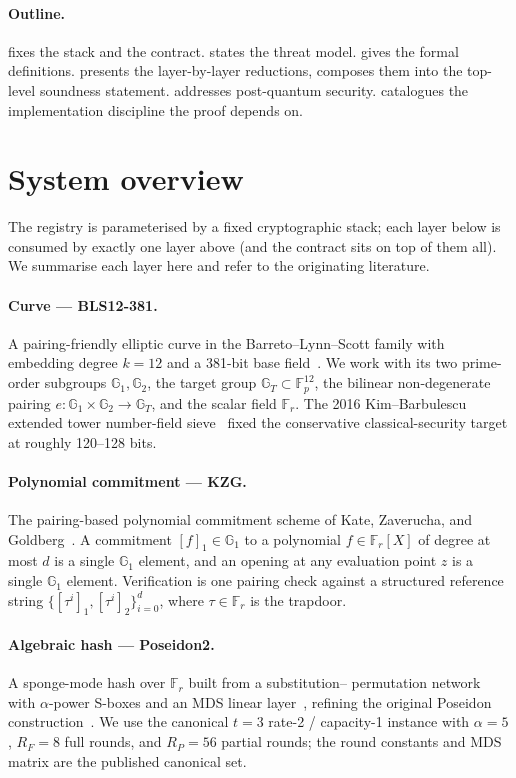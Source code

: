 \documentclass[11pt,a4paper]{article}
\theoremstyle{plain}
\theoremstyle{definition}
\newcommand{\Fr}{\mathbb{F}_r}
\newcommand{\Fp}{\mathbb{F}_p}
\newcommand{\GT}{\mathbb{G}_T}
\newcommand{\Gone}{\mathbb{G}_1}
\newcommand{\Gtwo}{\mathbb{G}_2}
\begin{document}
\paragraph{Outline.}  fixes the stack and the
contract.  states the threat model.
 gives the formal definitions. 
presents the layer-by-layer reductions,  composes
them into the top-level soundness statement. 
addresses post-quantum security.  catalogues the
implementation discipline the proof depends on.

\section{System overview}
\label{sec:system}

The registry is parameterised by a fixed cryptographic stack;
each layer below is consumed by exactly one layer above (and the
contract sits on top of them all). We summarise each layer here
and refer to the originating literature.

\paragraph{Curve --- BLS12-381.}
A pairing-friendly elliptic curve in the Barreto--Lynn--Scott
family with embedding degree $k=12$ and a 381-bit base
field~\cite{bowe-2017-bls12381}. We work with its two prime-order
subgroups $\Gone, \Gtwo$, the target group $\GT \subset
\Fp^{12}$, the bilinear non-degenerate pairing
$e \colon \Gone \times \Gtwo \to \GT$, and the scalar field
$\Fr$. The 2016 Kim--Barbulescu extended tower number-field
sieve~\cite{kim-barbulescu-2016} fixed the conservative
classical-security target at roughly 120--128 bits.

\paragraph{Polynomial commitment --- KZG.}
The pairing-based polynomial commitment scheme of Kate,
Zaverucha, and Goldberg~\cite{kate-2010-kzg}. A commitment $[f]_1
\in \Gone$ to a polynomial $f \in \Fr[X]$ of degree at most $d$
is a single $\Gone$ element, and an opening at any evaluation
point $z$ is a single $\Gone$ element. Verification is one
pairing check against a structured reference string
$\{[\tau^i]_1, [\tau^i]_2\}_{i=0}^{d}$, where $\tau \in \Fr$ is
the trapdoor.

\paragraph{Algebraic hash --- Poseidon2.}
A sponge-mode hash over $\Fr$ built from a substitution--%
permutation network with $\alpha$-power S-boxes and an MDS linear
layer~\cite{grassi-2023-poseidon2}, refining the original Poseidon
construction~\cite{grassi-2021-poseidon}. We use the canonical
$t=3$ rate-2 / capacity-1 instance with $\alpha = 5$, $R_F = 8$
full rounds, and $R_P = 56$ partial rounds; the round constants
and MDS matrix are the published canonical set.
\end{document}

